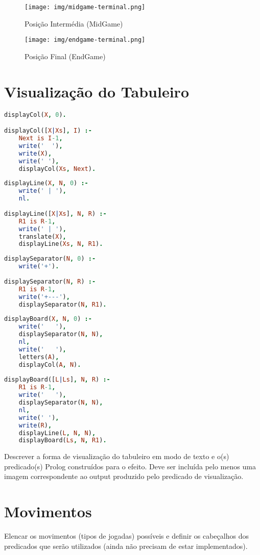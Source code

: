 \documentclass[a4paper]{article}
\begin{document}
\begin{figure}[h!]
\centering
\begin{minipage}{.4\textwidth}
  \centering
  \texttt{[image: img/midgame-terminal.png]}
  \caption{Posição Intermédia (MidGame)}
  \label{fig:mid}
\end{minipage}%
\begin{minipage}{.4\textwidth}
  \centering
  \texttt{[image: img/endgame-terminal.png]}
  \caption{Posição Final (EndGame)}
  \label{fig:end}
\end{minipage}
\end{figure}

\section{Visualização do Tabuleiro}

\begin{lstlisting}[language=Prolog]
displayCol(X, 0).

displayCol([X|Xs], I) :- 
	Next is I-1, 
	write('  '), 
	write(X), 
	write(' '), 
	displayCol(Xs, Next).
\end{lstlisting}

\begin{lstlisting}[language=Prolog]
displayLine(X, N, 0) :- 
	write(' | '), 
	nl.
	
displayLine([X|Xs], N, R) :- 
	R1 is R-1, 
	write(' | '),
	translate(X),
	displayLine(Xs, N, R1).
\end{lstlisting}

\begin{lstlisting}[language=Prolog]
displaySeparator(N, 0) :- 
	write('+').
	
displaySeparator(N, R) :- 
	R1 is R-1, 
	write('+---'), 
	displaySeparator(N, R1).
\end{lstlisting}

\begin{lstlisting}[language=Prolog]
displayBoard(X, N, 0) :- 
	write('   '), 
	displaySeparator(N, N), 
	nl, 
	write('   '), 
	letters(A), 
	displayCol(A, N).
	
displayBoard([L|Ls], N, R) :- 
	R1 is R-1,
	write('   '), 
	displaySeparator(N, N),
	nl, 
	write(' '), 
	write(R),
	displayLine(L, N, N),
	displayBoard(Ls, N, R1).
\end{lstlisting}

Descrever a forma de visualização do tabuleiro em modo de texto e o(s) predicado(s) Prolog construídos para o efeito.
Deve ser incluída pelo menos uma imagem correspondente ao output produzido pelo predicado de visualização.


\section{Movimentos}

Elencar os movimentos (tipos de jogadas) possíveis e definir os cabeçalhos dos predicados que serão utilizados (ainda não precisam de estar implementados).
\end{document}
